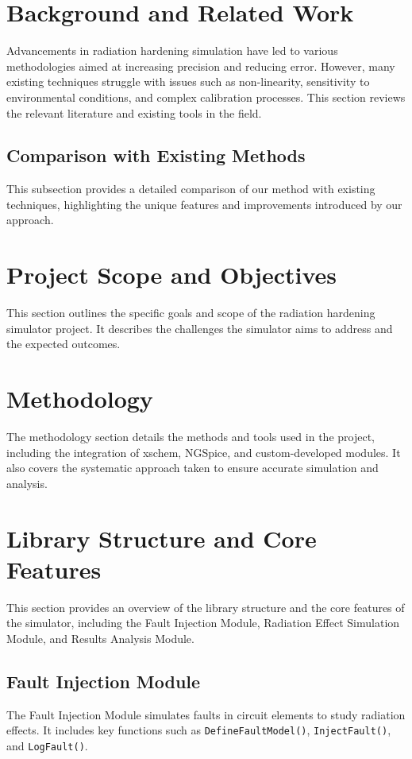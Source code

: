 \documentclass[conference]{IEEEtran}
\begin{document}
\section{Background and Related Work}
Advancements in radiation hardening simulation have led to various methodologies aimed at increasing precision and reducing error. However, many existing techniques struggle with issues such as non-linearity, sensitivity to environmental conditions, and complex calibration processes. This section reviews the relevant literature and existing tools in the field.

\subsection{Comparison with Existing Methods}
This subsection provides a detailed comparison of our method with existing techniques, highlighting the unique features and improvements introduced by our approach.

\section{Project Scope and Objectives}
This section outlines the specific goals and scope of the radiation hardening simulator project. It describes the challenges the simulator aims to address and the expected outcomes.

\section{Methodology}
The methodology section details the methods and tools used in the project, including the integration of xschem, NGSpice, and custom-developed modules. It also covers the systematic approach taken to ensure accurate simulation and analysis.

\section{Library Structure and Core Features}
This section provides an overview of the library structure and the core features of the simulator, including the Fault Injection Module, Radiation Effect Simulation Module, and Results Analysis Module.

\subsection{Fault Injection Module}
The Fault Injection Module simulates faults in circuit elements to study radiation effects. It includes key functions such as \texttt{DefineFaultModel()}, \texttt{InjectFault()}, and \texttt{LogFault()}.
\end{document}
